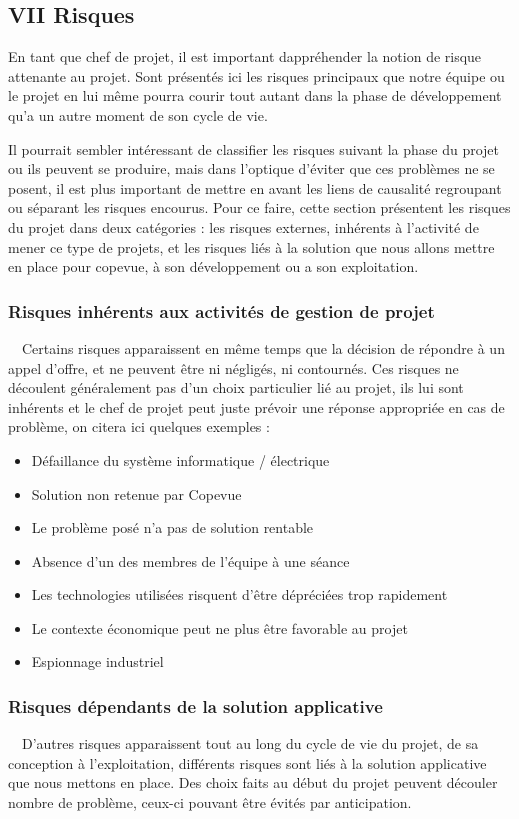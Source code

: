 \documentclass{article}
\begin{document}
\subsection[VII Risques]{VII Risques}
En tant que chef de projet, il est important
d{\textquotesingle}appréhender la notion de risque attenante au projet.
Sont présentés ici les risques principaux que notre équipe ou le projet
en lui même pourra courir tout autant dans la phase de développement
qu’a un autre moment de son cycle de vie.

Il pourrait sembler intéressant de classifier les risques suivant la
phase du projet ou ils peuvent se produire, mais dans l’optique
d’éviter que ces problèmes ne se posent, il est plus important de
mettre en avant les liens de causalité regroupant ou séparant les
risques encourus. Pour ce faire, cette section présentent les risques
du projet dans deux catégories : les risques externes, inhérents à
l’activité de mener ce type de projets, et les risques liés à la
solution que nous allons mettre en place pour copevue, à son
développement ou a son exploitation.

\subsubsection[Risques inhérents aux activités de gestion de
projet]{Risques inhérents aux activités de gestion de projet}
\ \ Certains risques apparaissent en même temps que la décision de
répondre à un appel d’offre, et ne peuvent être ni négligés, ni
contournés. Ces risques ne découlent généralement pas d’un choix
particulier lié au projet, ils lui sont inhérents et le chef de projet
peut juste prévoir une réponse appropriée en cas de problème, on citera
ici quelques exemples :

\begin{itemize}
\item Défaillance du système informatique / électrique
\item Solution non retenue par Copevue
\item Le problème posé n’a pas de solution rentable
\item Absence d’un des membres de l’équipe à une séance
\item Les technologies utilisées risquent d’être dépréciées trop
rapidement
\item Le contexte économique peut ne plus être favorable au projet
\item Espionnage industriel
\end{itemize}
\subsubsection[Risques dépendants de la solution applicative]{Risques
dépendants de la solution applicative}
\ \ D’autres risques apparaissent tout au long du cycle de vie du
projet, de sa conception à l’exploitation, différents risques sont liés
à la solution applicative que nous mettons en place. Des choix faits au
début du projet peuvent découler nombre de problème, ceux-ci pouvant
être évités par anticipation.
\end{document}
